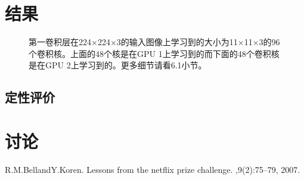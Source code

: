 \documentclass[12pt]{article}
\begin{document}
\begin{CJK*}{UTF8}{gkai}
\section{结果}


\begin{figure}[h]
  \centering
  \caption{第一卷积层在224×224×3的输入图像上学习到的大小为11×11×3的96个卷积核。上面的48个核是在GPU 1上学习到的而下面的48个卷积核是在GPU 2上学习到的。更多细节请看6.1小节。}
  \label{fig:fig3}
\end{figure}

\subsection{定性评价}



\section{讨论}




  
% 

\begin{thebibliography}{1}

R.M.BellandY.Koren.
\newblock Lessons from the netflix prize challenge.
,9(2):75–79, 2007. 


\end{thebibliography}
\end{CJK*}
\end{document}
